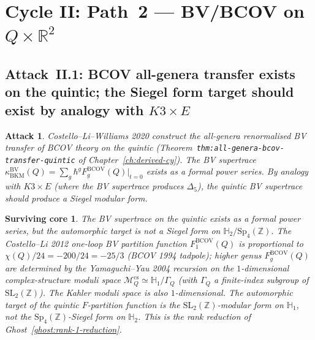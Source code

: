 \documentclass[11pt]{amsart}
\newtheorem{attack}[theorem]{Attack}
\newtheorem{surviving}[theorem]{Surviving core}
\providecommand{\R}{\mathbb{R}}
\providecommand{\Z}{\mathbb{Z}}
\providecommand{\Sp}{\mathrm{Sp}}
\providecommand{\SL}{\mathrm{SL}}
\providecommand{\BV}{\mathrm{BV}}
\providecommand{\kBKM}{\kappa_{\mathrm{BKM}}}
\begin{document}
\section{Cycle II: Path~2 --- BV/BCOV on $Q \times \R^2$}
\label{sec:cycle-2-bv-quintic}

\subsection{Attack~II.1: BCOV all-genera transfer exists on the quintic;
the Siegel form target should exist by analogy with $K3 \times E$}

\begin{attack}
\label{att:bv-quintic-siegel-analogy}
Costello--Li--Williams 2020 construct the all-genera renormalised
BV transfer of BCOV theory on the quintic (Theorem~\texttt{thm:all-genera-bcov-transfer-quintic}
of Chapter~\ref{ch:derived-cy}). The BV supertrace
$\kBKM^{\BV}(Q) = \sum_g \hbar^g F_g^{\mathrm{BCOV}}(Q)|_{t = 0}$
exists as a formal power series. By analogy with $K3 \times E$
(where the BV supertrace produces $\Delta_5$), the quintic BV
supertrace should produce a Siegel modular form.
\end{attack}

\begin{surviving}
\label{surv:bv-quintic-rank-1-target}
The BV supertrace on the quintic exists as a formal power series,
but the automorphic target is \emph{not} a Siegel form on
$\mathbb{H}_2 / \Sp_4(\Z)$. The Costello--Li 2012 one-loop BV
partition function $F_1^{\mathrm{BCOV}}(Q)$ is proportional to
$\chi(Q) / 24 = -200/24 = -25/3$ (BCOV 1994 tadpole); higher genus
$F_g^{\mathrm{BCOV}}(Q)$ are determined by the
Yamaguchi--Yau 2004 recursion on the $1$-dimensional complex-structure
moduli space $\mathcal{M}_Q^{\mathrm{cs}} \simeq \mathbb{H}_1 /
\Gamma_Q$ (with $\Gamma_Q$ a finite-index subgroup of $\SL_2(\Z)$).
The Kahler moduli space is also $1$-dimensional. The automorphic
target of the quintic $F$-partition function is the
$\SL_2(\Z)$-modular form on $\mathbb{H}_1$, not the $\Sp_4(\Z)$-Siegel
form on $\mathbb{H}_2$. This is the rank reduction of
Ghost~\ref{ghost:rank-1-reduction}.
\end{surviving}
\end{document}
